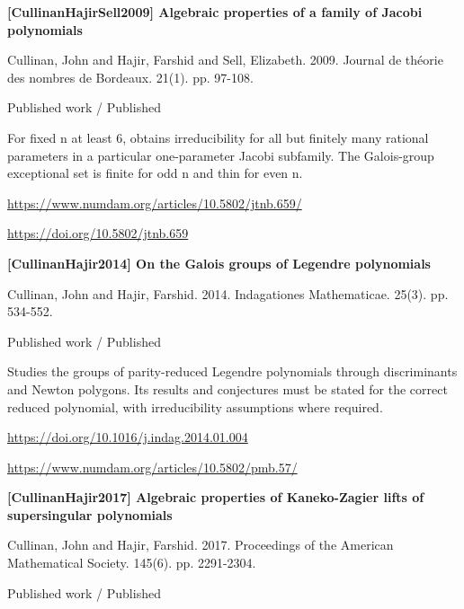 \documentclass[11pt,a4paper,oneside,openany]{book}
\begin{document}
\vspace{9pt}
\hypertarget{ref:CullinanHajirSell2009}{}
{\sffamily\bfseries\color{atlasgreen}[CullinanHajirSell2009] Algebraic properties of a family of Jacobi polynomials}\par
\color{black} Cullinan, John and Hajir, Farshid and Sell, Elizabeth. 2009. Journal de théorie des nombres de Bordeaux. 21(1). pp. 97-108.\par
{\small\sffamily\color{atlasgold}Published work / Published}\par
\color{black} For fixed n at least 6, obtains irreducibility for all but finitely many rational parameters in a particular one-parameter Jacobi subfamily. The Galois-group exceptional set is finite for odd n and thin for even n.\par
{\footnotesize\url{https://www.numdam.org/articles/10.5802/jtnb.659/}}\par
{\footnotesize\url{https://doi.org/10.5802/jtnb.659}}\par
\vspace{9pt}
\hypertarget{ref:CullinanHajir2014}{}
{\sffamily\bfseries\color{atlasgreen}[CullinanHajir2014] On the Galois groups of Legendre polynomials}\par
\color{black} Cullinan, John and Hajir, Farshid. 2014. Indagationes Mathematicae. 25(3). pp. 534-552.\par
{\small\sffamily\color{atlasgold}Published work / Published}\par
\color{black} Studies the groups of parity-reduced Legendre polynomials through discriminants and Newton polygons. Its results and conjectures must be stated for the correct reduced polynomial, with irreducibility assumptions where required.\par
{\footnotesize\url{https://doi.org/10.1016/j.indag.2014.01.004}}\par
{\footnotesize\url{https://www.numdam.org/articles/10.5802/pmb.57/}}\par
\vspace{9pt}
\hypertarget{ref:CullinanHajir2017}{}
{\sffamily\bfseries\color{atlasgreen}[CullinanHajir2017] Algebraic properties of Kaneko-Zagier lifts of supersingular polynomials}\par
\color{black} Cullinan, John and Hajir, Farshid. 2017. Proceedings of the American Mathematical Society. 145(6). pp. 2291-2304.\par
{\small\sffamily\color{atlasgold}Published work / Published}\par
\end{document}

